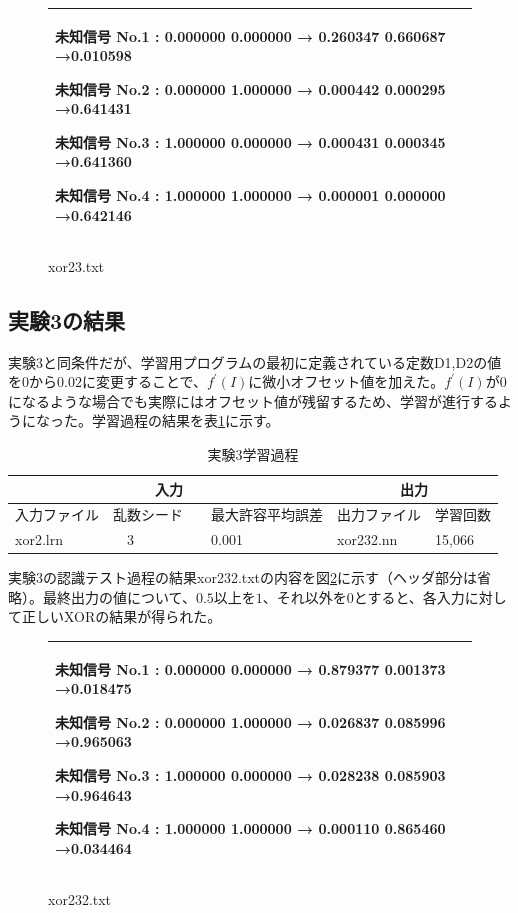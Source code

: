 \documentclass[final]{jarticle}[2012/05/15]
\begin{document}
\begin{figure}[h]
  \begin{center}
    \begin{tabular}{|p{12cm}|}\hline
      未知信号 No.1 : 0.000000 0.000000  → 0.260347 0.660687 →0.010598　\par
      未知信号 No.2 : 0.000000 1.000000  → 0.000442 0.000295 →0.641431　\par
      未知信号 No.3 : 1.000000 0.000000  → 0.000431 0.000345 →0.641360　\par
      未知信号 No.4 : 1.000000 1.000000  → 0.000001 0.000000 →0.642146　\\ \hline
    \end{tabular}
    \caption{xor23.txt} \label{zi_ke_2}
  \end{center}
 \end{figure}
\pagebreak
\subsection{実験3の結果}
実験3と同条件だが、学習用プログラムの最初に定義されている定数D1,D2の値を$0$から$0.02$に変更することで、$f^{\prime}(I)$に微小オフセット値を加えた。$f^{\prime}(I)$が$0$になるような場合でも実際にはオフセット値が残留するため、学習が進行するようになった。学習過程の結果を表\ref{zi_ga_3}に示す。\par
\begin{table}[h]
  \begin{center}
    \caption{実験3学習過程} \label{zi_ga_3}
    \begin{tabular}{|l|l|l|l|l|}\hline
    \multicolumn{3}{|c|}{入力} & \multicolumn{2}{|c|}{出力} \\ \hline
    入力ファイル & 乱数シード &　最大許容平均誤差 & 出力ファイル & 学習回数 \\ \hline
    xor2.lrn &　3 &　0.001 & xor232.nn & 15,066 \\ \hline
    \end{tabular}
  \end{center}
\end{table}
実験3の認識テスト過程の結果xor232.txtの内容を図\ref{zi_ke_3}に示す（ヘッダ部分は省略）。最終出力の値について、$0.5$以上を$1$、それ以外を$0$とすると、各入力に対して正しいXORの結果が得られた。\par
\begin{figure}[h]
  \begin{center}
    \begin{tabular}{|p{12cm}|}\hline
      未知信号 No.1 : 0.000000 0.000000  → 0.879377 0.001373 →0.018475　\par
      未知信号 No.2 : 0.000000 1.000000  → 0.026837 0.085996 →0.965063　\par
      未知信号 No.3 : 1.000000 0.000000  → 0.028238 0.085903 →0.964643　\par
      未知信号 No.4 : 1.000000 1.000000  → 0.000110 0.865460 →0.034464　\\ \hline
    \end{tabular}
    \caption{xor232.txt} \label{zi_ke_3}
  \end{center}
\end{figure}
\pagebreak
\end{document}
